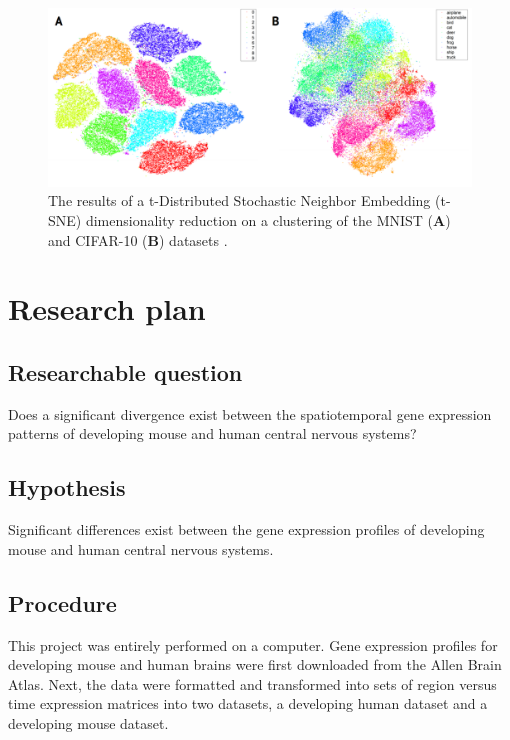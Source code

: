 \documentclass[12pt,oneside,onecolumn,a4paper]{article}
\begin{document}
\begin{figure}[H]
\begin{center}
\includegraphics[width=0.8\columnwidth]{figures/tsne}
\caption{The results of a t-Distributed Stochastic Neighbor Embedding (t-SNE) dimensionality reduction on a clustering of the MNIST (\textbf{A}) and CIFAR-10 (\textbf{B}) datasets \citep{laurensvandermaaten2014}. \label{fig:clusters}%
}
\end{center}
\end{figure}

\section{Research plan}


\subsection{Researchable question}
Does a significant divergence exist between the spatiotemporal gene expression patterns of developing mouse and human central nervous systems?

\subsection{Hypothesis}

Significant differences exist between the gene expression profiles of developing mouse and human central nervous systems.

\subsection{Procedure}
This project was entirely performed on a computer. Gene expression profiles for developing mouse and human brains were first downloaded from the Allen Brain Atlas. Next, the data were formatted and transformed into sets of region versus time expression matrices into two datasets, a developing human dataset and a developing mouse dataset. 
\end{document}
